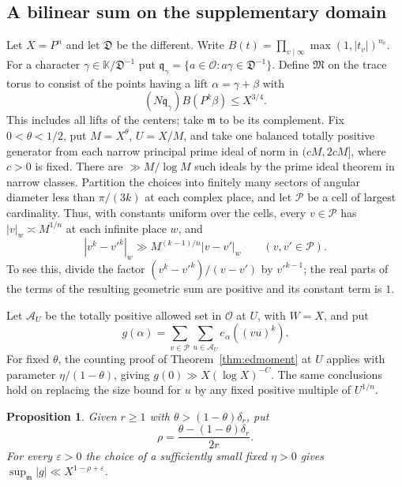 \documentclass[11pt,letterpaper]{article}
\newtheorem{proposition}[proposition]{Proposition}
\theoremstyle{definition}
\numberwithin{equation}{section}
\begin{document}
\subsection{A bilinear sum on the supplementary domain}
Let $X=P^n$ and let $\mathfrak D$ be the different. Write
$B(t)=\prod_{v\mid\infty}\max(1,|t_v|)^{n_v}$. For a character
$\gamma\in\mathbb K/\mathfrak D^{-1}$ put
$\mathfrak q_\gamma=\{a\in\mathcal O:a\gamma\in\mathfrak D^{-1}\}$.
Define $\mathfrak M$ on the trace torus to consist of the points having
a lift $\alpha=\gamma+\beta$ with
\begin{equation}\label{eq:edmajor}
       (N\mathfrak q_\gamma) B(P^k\beta)\le X^{3/4}.
\end{equation}
This includes all lifts of the centers; take $\mathfrak m$ to be its
complement. Fix $0<\theta<1/2$, put $M=X^\theta$, $U=X/M$, and take
one balanced totally positive generator from each narrow principal
prime ideal of norm in $(cM,2cM]$, where $c>0$ is fixed. There are
$\gg M/\log M$ such ideals by the prime ideal theorem in narrow classes.
Partition the choices into finitely many sectors of angular diameter
less than $\pi/(3k)$ at each complex place, and let $\mathcal P$ be
a cell of largest cardinality. Thus, with constants uniform over the
cells, every $v\in\mathcal P$ has $|v|_w\asymp M^{1/n}$ at each
infinite place $w$, and
\begin{equation}\label{eq:edlip}
 |v^k-v'^k|_w\gg M^{(k-1)/n}|v-v'|_w\qquad(v,v'\in\mathcal P).
\end{equation}
To see this, divide the factor $(v^k-v'^k)/(v-v')$ by $v'^{k-1}$;
the real parts of the terms of the resulting geometric sum are positive
and its constant term is $1$.

Let $\mathcal A_U$ be the totally positive allowed set in $\mathcal O$
at $U$, with $W=X$, and put
\[
               g(\alpha)=\sum_{v\in\mathcal P}
                         \sum_{u\in\mathcal A_U} e_\alpha((vu)^k).
\]
For fixed $\theta$, the counting proof of Theorem~\ref{thm:edmoment}
at $U$ applies with parameter $\eta/(1-\theta)$, giving
$g(0)\gg X(\log X)^{-C}$. The same conclusions hold on replacing the
size bound for $u$ by any fixed positive multiple of $U^{1/n}$.

\begin{proposition}\label{prop:edbilinear}
Given $r\ge1$ with $\theta>(1-\theta)\delta_r$, put
\[
             \rho=\frac{\theta-(1-\theta)\delta_r}{2r}.
\]
For every $\varepsilon>0$ the choice of a sufficiently small fixed
$\eta>0$ gives $\sup_{\mathfrak m}|g|\ll X^{1-\rho+\varepsilon}$.
\end{proposition}
\end{document}
